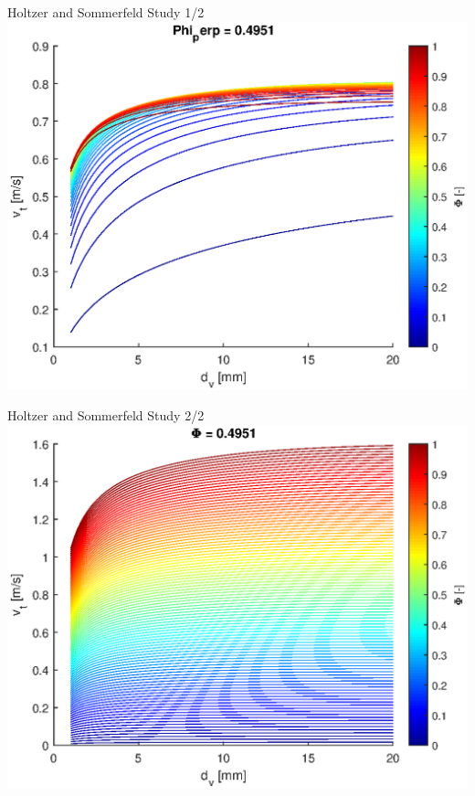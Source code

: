 \documentclass[11pt]{beamer}
\begin{document}
		\begin{frame}{Holtzer and Sommerfeld Study 1/2}
		\centering
		\includegraphics[width=\linewidth]{HoltzerSommerfeldStudy.eps}
	\end{frame}
	
	\begin{frame}{Holtzer and Sommerfeld Study 2/2}
		\centering
		\includegraphics[width=\linewidth]{HoltzerSommerfeldStudy2.eps}
	\end{frame}
	
\end{document}
